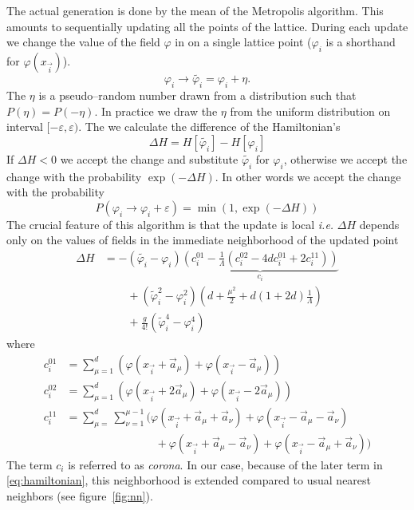 \documentclass[a4paper]{llncs}
\renewcommand{\a}[1]{\v{a}_{#1}}
\renewcommand{\v}[1]{\vec{#1}}
\newcommand{\vphi}{\varphi}
\newcommand{\vi}{{\vec{i}}}
\begin{document}
The actual generation is done by the mean of the Metropolis
algorithm. This amounts to sequentially updating all the points of the
lattice. During each update we change the value of the field $\vphi$
in on a single lattice point ($\vphi_i$ is a shorthand for $\vphi(x_\vi)$).
\begin{equation}
\vphi_i\longrightarrow\widetilde{\vphi_i}=\vphi_i+\eta.
\end{equation}
The $\eta$ is a pseudo--random number drawn from a distribution such
that $P(\eta) = P(-\eta)$. In practice we draw the $\eta$ from the
uniform distribution on interval $[-\varepsilon,\varepsilon)$.  The we
calculate the difference of the Hamiltonian's
\begin{equation}
\Delta H=H[\widetilde{\vphi_i}]-H[\vphi_i]
\end{equation}
If $\Delta H < 0$ we accept the change and substitute
$\widetilde{\vphi_i}$ for $\vphi_i$, otherwise we accept the change
with the probability $\exp(-\Delta H)$. In other words we accept the
change with the probability
\begin{equation}
P(\vphi_i\rightarrow\vphi_i+\varepsilon)=\min\left(1,\exp(-\Delta H)\right)
\end{equation}
The crucial feature of this algorithm is that the update is local {\em
  i.e.} $\Delta H$ depends only on the values of fields in the
immediate neighborhood of the updated point 
\begin{equation}
\begin{split}
\Delta H & = -(\widetilde{\vphi_i}-\vphi_i)
\underbrace{\left(c^{01}_i-\frac{1}{\Lambda}(c^{02}_i-4 d c^{01}_i+2 c^{11}_i )\right)}_{c_i}\\ 
&\phantom{= -}
+(\widetilde{\vphi}^2_i-\vphi_i^2)\left(d+\frac{\mu^2}{2}+d (1+2d)\frac{1}{\Lambda}\right)\\
&\phantom{= -}+\frac{g}{4!}\left(\widetilde{\vphi}^4_i-\vphi^4_i\right)
\end{split}
\end{equation}
where
\begin{equation}\begin{split} 
c_i^{01}&=\sum_{\mu=1}^d\left(\vphi(x_\vi+\a\mu)+\vphi(x_\vi-\a\mu)\right)\\
c_i^{02}&=\sum_{\mu=1}^d\left(\vphi(x_\vi+2\a\mu)+\vphi(x_\vi-2\a\mu)\right)\\
c_i^{11}&=\sum_{\mu=}^d\sum_{\nu=1}^{\mu-1}
\bigl(\vphi(x_\vi+\a\mu+\a\nu)+\vphi(x_\vi-\a\mu-\a\nu)\\
&\phantom{+=\sum_{\mu=}^d\sum_{\nu=1}^{\mu-1}
}
+ \vphi(x_\vi+\a\mu-\a\nu)+\vphi(x_\vi-\a\mu+\a\nu)
\bigr)
\end{split}
\end{equation}
The term $c_i$ is referred to as {\em corona}. 
In our case, because of
the later term in \eqref{eq:hamiltonian}, this neighborhood is
extended compared to usual nearest neighbors (see figure~\ref{fig:nn}). 
\end{document}
